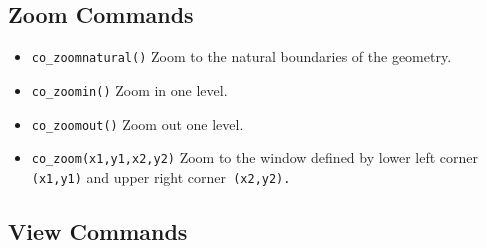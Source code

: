 \subsection{Zoom Commands}

\begin{itemize}
\item \texttt{co\_zoomnatural()} Zoom to the natural boundaries of the geometry.

\item \texttt{co\_zoomin()} Zoom in one level.

\item \texttt{co\_zoomout()} Zoom out one level.

\item \texttt{co\_zoom(x1,y1,x2,y2)} Zoom to the window defined by lower left corner
\texttt{(x1,y1)} and upper right corner\texttt{ (x2,y2).}
\end{itemize}



\subsection{View Commands}

